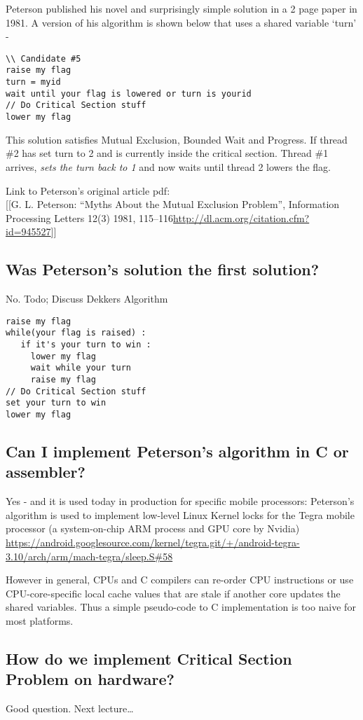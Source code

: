 Peterson published his novel and surprisingly simple solution in a 2
page paper in 1981. A version of his algorithm is shown below that uses
a shared variable `turn' -

\begin{verbatim}
\\ Candidate #5
raise my flag
turn = myid
wait until your flag is lowered or turn is yourid
// Do Critical Section stuff
lower my flag
\end{verbatim}

This solution satisfies Mutual Exclusion, Bounded Wait and Progress. If
thread \#2 has set turn to 2 and is currently inside the critical
section. Thread \#1 arrives, \emph{sets the turn back to 1} and now
waits until thread 2 lowers the flag.

Link to Peterson's original article pdf:\\{[}{[}G. L. Peterson: ``Myths
About the Mutual Exclusion Problem'', Information Processing Letters
12(3) 1981,
115--116\textbar{}\url{http://dl.acm.org/citation.cfm?id=945527}{]}{]}

\subsection{Was Peterson's solution the first
solution?}\label{was-petersons-solution-the-first-solution}

No. Todo; Discuss Dekkers Algorithm

\begin{verbatim}
raise my flag
while(your flag is raised) :
   if it's your turn to win :
     lower my flag
     wait while your turn
     raise my flag
// Do Critical Section stuff
set your turn to win
lower my flag
\end{verbatim}

\subsection{Can I implement Peterson's algorithm in C or
assembler?}\label{can-i-implement-petersons-algorithm-in-c-or-assembler}

Yes - and it is used today in production for specific mobile processors:
Peterson's algorithm is used to implement low-level Linux Kernel locks
for the Tegra mobile processor (a system-on-chip ARM process and GPU
core by
Nvidia)\\\url{https://android.googlesource.com/kernel/tegra.git/+/android-tegra-3.10/arch/arm/mach-tegra/sleep.S\#58}

However in general, CPUs and C compilers can re-order CPU instructions
or use CPU-core-specific local cache values that are stale if another
core updates the shared variables. Thus a simple pseudo-code to C
implementation is too naive for most platforms.

\subsection{How do we implement Critical Section Problem on
hardware?}\label{how-do-we-implement-critical-section-problem-on-hardware}

Good question. Next lecture\ldots{}
